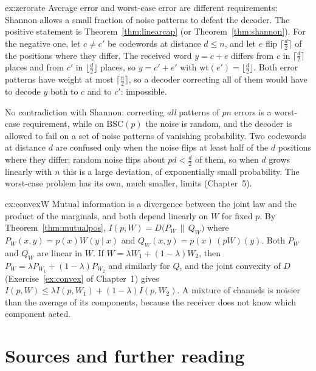 \begin{solution}{ex:zerorate}
\idea Average error and worst-case error are different requirements: Shannon allows a small fraction of noise patterns to defeat the decoder.
\writeup The positive statement is Theorem~\ref{thm:linearcap} (or Theorem~\ref{thm:shannon}). For the negative one, let $c\ne c'$ be codewords at distance $d\le n$, and let $e$ flip $\lceil\frac d2\rceil$ of the positions where they differ. The received word $y=c+e$ differs from $c$ in $\lceil\frac d2\rceil$ places and from $c'$ in $\lfloor\frac d2\rfloor$ places, so $y=c'+e'$ with $\mathrm{wt}(e')=\lfloor\frac d2\rfloor$. Both error patterns have weight at most $\lceil\frac n2\rceil$, so a decoder correcting all of them would have to decode $y$ both to $c$ and to $c'$: impossible.

No contradiction with Shannon: correcting \emph{all} patterns of $pn$ errors is a worst-case requirement, while on $\mathrm{BSC}(p)$ the noise is random, and the decoder is allowed to fail on a set of noise patterns of vanishing probability. Two codewords at distance $d$ are confused only when the noise flips at least half of the $d$ positions where they differ; random noise flips about $pd<\frac d2$ of them, so when $d$ grows linearly with $n$ this is a large deviation, of exponentially small probability. The worst-case problem has its own, much smaller, limits (Chapter~5).
\end{solution}

\begin{solution}{ex:convexW}
\idea Mutual information is a divergence between the joint law and the product of the marginals, and both depend linearly on $W$ for fixed $p$.
\writeup By Theorem~\ref{thm:mutualpos}, $I(p,W)=D\bigl(P_W\,\|\,Q_W\bigr)$ where $P_W(x,y)=p(x)W(y\mid x)$ and $Q_W(x,y)=p(x)\,(pW)(y)$. Both $P_W$ and $Q_W$ are linear in $W$. If $W=\lambda W_1+(1-\lambda)W_2$, then $P_W=\lambda P_{W_1}+(1-\lambda)P_{W_2}$ and similarly for $Q$, and the joint convexity of $D$ (Exercise~\ref{ex:convex} of Chapter~1) gives $I(p,W)\le\lambda I(p,W_1)+(1-\lambda)I(p,W_2)$. A mixture of channels is noisier than the average of its components, because the receiver does not know which component acted.
\end{solution}

\section*{Sources and further reading}

